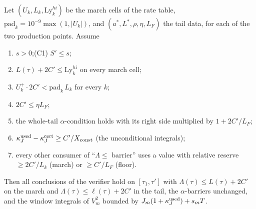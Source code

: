 \documentclass[11pt]{article}
\newcommand{\fn}[1]{\texttt{\detokenize{#1}}}
\begin{document}
\begin{proposition}\label{F:prop:abs}
Let $(U_k,L_k,\mathrm{Ly}^{hi}_k)$ be the march cells of the rate table, $\mathrm{pad}_k=10^{-9}\max(1,|U_k|)$, and $(a^*,L^*,\rho,\eta,L_F)$ the tail data, for each of the two production points. Assume
\begin{enumerate}[label=(C\arabic*),leftmargin=3em,start=0]
\item $s>0$;\quad \textup{(C1)} $S'\le s$;
\setcounter{enumi}{1}
\item $L(\tau)+2C'\le\mathrm{Ly}^{hi}_k$ on every march cell;
\item $U_k^+\cdot2C'<\mathrm{pad}_k\,L_k$ for every $k$;
\item $2C'\le\eta L_F$;
\item the whole-tail $\alpha$-condition holds with its right side multiplied by $1+2C'/L_F$;
\item $\kappa_J^{\rm used}-\kappa_J^{\rm cert}\ge C'/X_{\rm const}$ (the unconditional integrals);
\item every other consumer of ``$\Lambda\le$ barrier'' uses a value with relative reserve $\ge2C'/L_k$ (march) or $\ge C'/L_F$ (floor).
\end{enumerate}
Then all conclusions of the verifier \fn{fin13v4c} hold on $[\tau_1,\tau']$ with $\Lambda(\tau)\le L(\tau)+2C'$ on the march and $\Lambda(\tau)\le\ell(\tau)+2C'$ in the tail, the $\alpha$-barriers unchanged, and the window integrals of $V_m^2$ bounded by $J_m(1+\kappa_J^{\rm used})+s_mT$.
\end{proposition}
\end{document}
